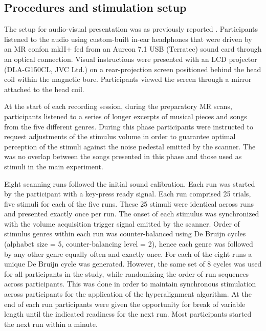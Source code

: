 \subsection*{Procedures and stimulation setup}

The setup for audio-visual presentation was as previously reported
\cite{Hanke_2014}. Participants listened to the audio using custom-built in-ear
headphones that were driven by an MR confon mkII+ fed from an Aureon 7.1 USB
(Terratec) sound card through an optical connection.
Visual instructions were presented with an LCD projector (DLA-G150CL, JVC Ltd.)
on a rear-projection screen positioned behind the head coil within the magnetic
bore. Participants viewed the screen through a mirror attached to the head
coil.

At the start of each recording session, during the preparatory MR scans,
participants listened to a series of longer excerpts of musical pieces and
songs from the five different genres. During this phase participants were
instructed to request adjustments of the stimulus volume in order to guarantee
optimal perception of the stimuli against the noise pedestal emitted by the
scanner. The was no overlap between the songs presented in this phase and those
used as stimuli in the main experiment.

Eight scanning runs followed the initial sound calibration. Each run was
started by the participant with a key-press ready signal. Each run comprised 25
trials, five stimuli for each of the five runs. These 25 stimuli were identical
across runs and presented exactly once per run. The onset of each stimulus was
synchronized with the volume acquisition trigger signal emitted by the scanner.
Order of stimulus genres within each run was counter-balanced using De Bruijn
cycles \cite{Aguirre_2011} (alphabet size = 5, counter-balancing level = 2),
hence each genre was followed by any other genre equally often and exactly
once.  For each of the eight runs a unique De Bruijn cycle was generated.
However, the same set of 8 cycles was used for all participants in the study,
while randomizing the order of run sequences across participants. This was done
in order to maintain synchronous stimulation across participants for the
application of the hyperalignment algorithm. At the end of each run
participants were given the opportunity for break of variable length until the
indicated readiness for the next run. Most participants started the next run
within a minute.

